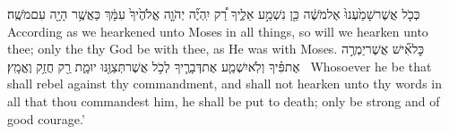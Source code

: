 {כְּכֹ֤ל אֲשֶׁר\maqqaf שָׁמַ֙עְנוּ֙ אֶל\maqqaf מֹשֶׁ֔ה כֵּ֖ן נִשְׁמַ֣ע אֵלֶ֑יךָ רַ֠ק יִֽהְיֶ֞ה יְהֹוָ֤ה אֱלֹהֶ֙יךָ֙ עִמָּ֔ךְ כַּאֲשֶׁ֥ר הָיָ֖ה עִם\maqqaf מֹשֶֽׁה׃}
{According as we hearkened unto Moses in all things, so will we hearken unto thee; only the \lord\space thy God be with thee, as He was with Moses.}
{כׇּל\maqqaf אִ֞ישׁ אֲשֶׁר\maqqaf יַמְרֶ֣ה אֶת\maqqaf פִּ֗יךָ וְלֹֽא\maqqaf יִשְׁמַ֧ע אֶת\maqqaf דְּבָרֶ֛יךָ לְכֹ֥ל אֲשֶׁר\maqqaf תְּצַוֶּ֖נּוּ יוּמָ֑ת רַ֖ק חֲזַ֥ק וֶאֱמָֽץ׃ \petucha }
{Whosoever he be that shall rebel against thy commandment, and shall not hearken unto thy words in all that thou commandest him, he shall be put to death; only be strong and of good courage.’}
